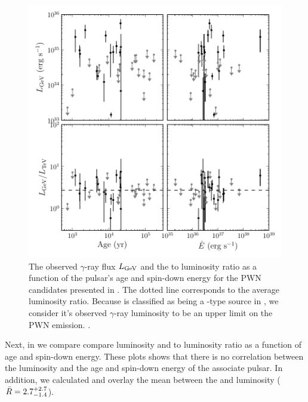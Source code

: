 \begin{figure}[htbp]
  \centering
  \includegraphics{chapters/population_study/figures/pwn_age_edot_vs_l_gev.pdf}
  \caption{The observed $\gamma$-ray flux $L_\text{GeV}$ and the
  \gev to \tev luminosity ratio as a
  function of the pulsar's age and spin-down energy
  for the \ac{PWN} candidates presented in
  .  The dotted line
  corresponds to the average luminosity ratio.  Because 
  is classified as being a \PSRClass-type source in ,
  we consider it's observed $\gamma$-ray luminosity to be an upper limit
  on the \ac{PWN} emission.  .}
\end{figure}

Next, in  we compare compare \gev
luminosity and \gev to \tev luminosity ratio as a function of age and
spin-down energy.  These plots shows that there is no correlation between
the \gev luminosity and the age and spin-down energy of the associate
pulsar.  In addition, we calculated and overlay the mean between the
\gev and \tev luminosity ($\bar{R}=2.7_{-1.4}^{+2.7}$).



